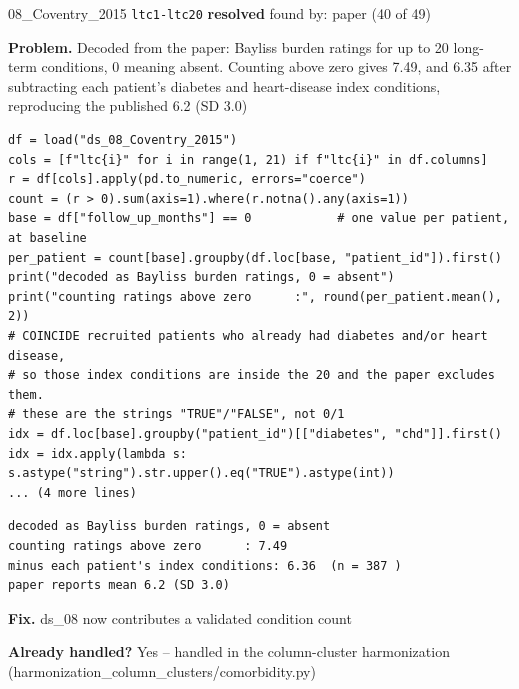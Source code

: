 \documentclass[9pt, t, handout]{beamer}
\newcommand{\ans}[1]{\textcolor{structure.fg}{#1}}
\begin{document}
\begin{frame}[fragile]{08\_Coventry\_2015 \quad \texttt{ltc1-ltc20}}
  {\scriptsize\textcolor{green!45!black}{\textbf{resolved}} \quad
   found by: paper \quad (40 of 49)}
  \vspace{3pt}

  {\footnotesize \textbf{Problem.} Decoded from the paper: Bayliss burden ratings for up to 20 long-term conditions, 0 meaning absent. Counting above zero gives 7.49, and 6.35 after subtracting each patient's diabetes and heart-disease index conditions, reproducing the published 6.2 (SD 3.0)}
  \vspace{4pt}

  \begin{Verbatim}[fontsize=\tiny, frame=single, framesep=2pt, label=\tiny reproduce]
df = load("ds_08_Coventry_2015")
cols = [f"ltc{i}" for i in range(1, 21) if f"ltc{i}" in df.columns]
r = df[cols].apply(pd.to_numeric, errors="coerce")
count = (r > 0).sum(axis=1).where(r.notna().any(axis=1))
base = df["follow_up_months"] == 0            # one value per patient, at baseline
per_patient = count[base].groupby(df.loc[base, "patient_id"]).first()
print("decoded as Bayliss burden ratings, 0 = absent")
print("counting ratings above zero      :", round(per_patient.mean(), 2))
# COINCIDE recruited patients who already had diabetes and/or heart disease,
# so those index conditions are inside the 20 and the paper excludes them.
# these are the strings "TRUE"/"FALSE", not 0/1
idx = df.loc[base].groupby("patient_id")[["diabetes", "chd"]].first()
idx = idx.apply(lambda s: s.astype("string").str.upper().eq("TRUE").astype(int))
... (4 more lines)
  \end{Verbatim}
  \begin{Verbatim}[fontsize=\tiny, frame=single, framesep=2pt, label=\tiny output]
decoded as Bayliss burden ratings, 0 = absent
counting ratings above zero      : 7.49
minus each patient's index conditions: 6.36  (n = 387 )
paper reports mean 6.2 (SD 3.0)
  \end{Verbatim}
  \vspace{2pt}

  {\footnotesize \textbf{Fix.} ds\_08 now contributes a validated condition count}
  \vspace{2pt}

  {\footnotesize \textbf{Already handled?} \ans{Yes} -- handled in the column-cluster harmonization
   (harmonization\_column\_clusters/comorbidity.py)}
\end{frame}
\end{document}
